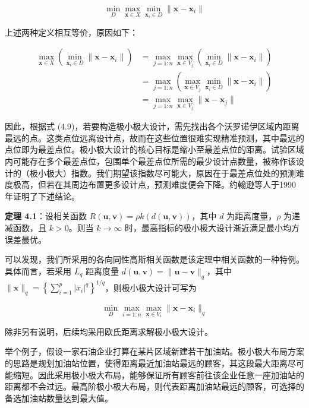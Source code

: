 \documentclass{ctexart}
\begin{document}
\begin{equation*}
\min_D\max_{\boldsymbol{x}\in X}\min_{\boldsymbol{x}_i\in D}\|\boldsymbol{x}-\boldsymbol{x}_i\|
\tag{4.10}
\end{equation*}

上述两种定义相互等价，原因如下：

\begin{align*}
\max_{\boldsymbol{x}\in X}\left(\min_{\boldsymbol{x}_i\in D}\|\boldsymbol{x}-\boldsymbol{x}_i\|\right)
&=\max_{j=1:n}\max_{\boldsymbol{x}\in V_j}\left(\min_{\boldsymbol{x}_i\in D}\|\boldsymbol{x}-\boldsymbol{x}_i\|\right)\\
&=\max_{j=1:n}\left(\max_{\boldsymbol{x}\in V_j}\min_{\boldsymbol{x}_i\in D}\|\boldsymbol{x}-\boldsymbol{x}_i\|\right)\\
&=\max_{j=1:n}\max_{\boldsymbol{x}\in V_j}\|\boldsymbol{x}-\boldsymbol{x}_j\|
\end{align*}

因此，根据式 (4.9)，若要构造极小极大设计，需先找出各个沃罗诺伊区域内距离最远的点。这类点位远离设计点，故而在这些位置很难实现精准预测，其中最远的点位即为最差点位。极小极大设计的核心目标是缩小至最差点位的距离。试验区域内可能存在多个最差点位，包围单个最差点位所需的最少设计点数量，被称作该设计的（极小极大）指数。我们期望该指数尽可能大，原因在于最差点位处的预测难度极高，但若在其周边布置更多设计点，预测难度便会下降。约翰逊等人于1990 年证明了下述结论。

\begin{mdquote}
\textbf{定理 4.1}：设相关函数 $R(\boldsymbol{u},\boldsymbol{v})=\rho k(d(\boldsymbol{u},\boldsymbol{v}))$，其中 $d$ 为距离度量，$\rho$ 为递减函数，且 $k>0$。则当 $k\to\infty$ 时，最高指标的极小极大设计渐近满足最小均方误差最优。
\end{mdquote}

可以发现，我们所采用的各向同性高斯相关函数是该定理中相关函数的一种特例。具体而言，若采用 $L_q$ 距离度量 $d(\boldsymbol{u},\boldsymbol{v})=\|\boldsymbol{u}-\boldsymbol{v}\|_q$，其中 $\|\boldsymbol{x}\|_q=\left\{\sum_{i=1}^p |x_i|^q\right\}^{1/q}$，则极小极大设计可写为

\begin{equation*}
\min_D\max_{i=1:n}\max_{\boldsymbol{x}\in V_i}\|\boldsymbol{x}-\boldsymbol{x}_i\|_q
\tag{4.11}
\end{equation*}

除非另有说明，后续均采用欧氏距离求解极小极大设计。

举个例子，假设一家石油企业打算在某片区域新建若干加油站。极小极大布局方案的思路是规划加油站位置，使得距离最近加油站最远的顾客，其这段最大距离尽可能缩短。因此采用极小极大布局，能够保证所有顾客前往该企业任意一座加油站的距离都不会过远。最高阶极小极大布局，则代表距离加油站最远的顾客，可选择的备选加油站数量达到最大值。
\end{document}
